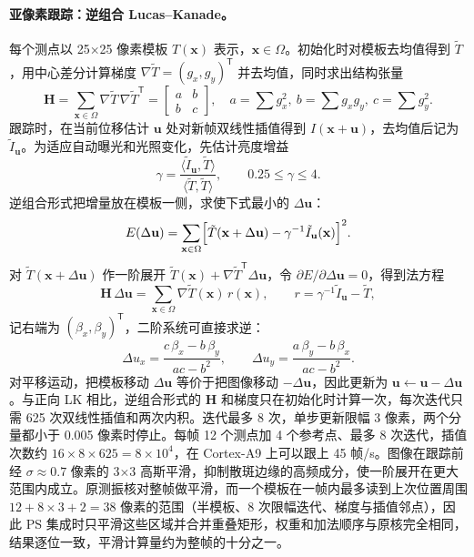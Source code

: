 \paragraph{亚像素跟踪：逆组合 Lucas–Kanade。}每个测点以 25×25 像素模板 $T(\mathbf{x})$ 表示，$\mathbf{x}\in\Omega$。初始化时对模板去均值得到 $\tilde T$，用中心差分计算梯度 $\nabla\tilde T=(g_x,g_y)^{\mathsf T}$ 并去均值，同时求出结构张量
\begin{equation}
\mathbf{H}=\sum_{\mathbf{x}\in\Omega}\nabla\tilde T\,\nabla\tilde T^{\mathsf T}=\begin{bmatrix}a&b\\b&c\end{bmatrix},\quad
a=\sum g_x^2,\ b=\sum g_xg_y,\ c=\sum g_y^2 .
\end{equation}
跟踪时，在当前位移估计 $\mathbf{u}$ 处对新帧双线性插值得到 $I(\mathbf{x}+\mathbf{u})$，去均值后记为 $\tilde I_{\mathbf u}$。为适应自动曝光和光照变化，先估计亮度增益
\begin{equation}
\gamma=\frac{\langle\tilde I_{\mathbf u},\tilde T\rangle}{\langle\tilde T,\tilde T\rangle},\qquad 0.25\le\gamma\le4 .
\end{equation}
逆组合形式把增量放在模板一侧，求使下式最小的 $\Delta\mathbf{u}$：
\begin{equation}
E(\Delta\mathbf{u})=\sum_{\mathbf{x}\in\Omega}\Bigl[\tilde T(\mathbf{x}+\Delta\mathbf{u})-\gamma^{-1}\tilde I_{\mathbf u}(\mathbf{x})\Bigr]^2 .
\end{equation}
对 $\tilde T(\mathbf{x}+\Delta\mathbf{u})$ 作一阶展开 $\tilde T(\mathbf{x})+\nabla\tilde T^{\mathsf T}\Delta\mathbf{u}$，令 $\partial E/\partial\Delta\mathbf{u}=0$，得到法方程
\begin{equation}
\mathbf{H}\,\Delta\mathbf{u}=\sum_{\mathbf{x}\in\Omega}\nabla\tilde T(\mathbf{x})\,r(\mathbf{x}),\qquad r=\gamma^{-1}\tilde I_{\mathbf u}-\tilde T ,
\end{equation}
记右端为 $(\beta_x,\beta_y)^{\mathsf T}$，二阶系统可直接求逆：
\begin{equation}
\Delta u_x=\frac{c\,\beta_x-b\,\beta_y}{ac-b^2},\qquad \Delta u_y=\frac{a\,\beta_y-b\,\beta_x}{ac-b^2}.
\end{equation}
对平移运动，把模板移动 $\Delta\mathbf{u}$ 等价于把图像移动 $-\Delta\mathbf{u}$，因此更新为 $\mathbf{u}\leftarrow\mathbf{u}-\Delta\mathbf{u}$。与正向 LK 相比，逆组合形式的 $\mathbf{H}$ 和梯度只在初始化时计算一次，每次迭代只需 625 次双线性插值和两次内积\cite{baker2004}。迭代最多 8 次，单步更新限幅 3 像素，两个分量都小于 0.005 像素时停止\cite{lucas1981}。每帧 12 个测点加 4 个参考点、最多 8 次迭代，插值次数约 $16\times8\times625=8\times10^4$，在 Cortex-A9 上可以跟上 45 帧/s。图像在跟踪前经 $\sigma\approx0.7$ 像素的 3×3 高斯平滑，抑制散斑边缘的高频成分，使一阶展开在更大范围内成立。原测振核对整帧做平滑，而一个模板在一帧内最多读到上次位置周围 $12+8\times3+2=38$ 像素的范围（半模板、8 次限幅迭代、梯度与插值邻点），因此 PS 集成时只平滑这些区域并合并重叠矩形，权重和加法顺序与原核完全相同，结果逐位一致，平滑计算量约为整帧的十分之一。

